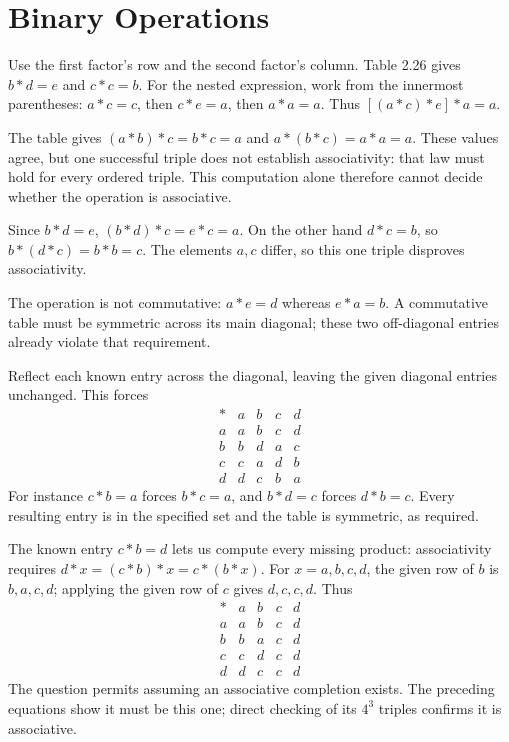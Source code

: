 \section{Binary Operations}


Use the first factor's row and the second factor's column. Table 2.26 gives $b*d=e$ and $c*c=b$. For the nested expression, work from the innermost parentheses: $a*c=c$, then $c*e=a$, then $a*a=a$. Thus $[(a*c)*e]*a=a$.


The table gives $(a*b)*c=b*c=a$ and $a*(b*c)=a*a=a$. These values agree, but one successful triple does not establish associativity: that law must hold for every ordered triple. This computation alone therefore cannot decide whether the operation is associative.


Since $b*d=e$, $(b*d)*c=e*c=a$. On the other hand $d*c=b$, so $b*(d*c)=b*b=c$. The elements $a,c$ differ, so this one triple disproves associativity.


The operation is not commutative: $a*e=d$ whereas $e*a=b$. A commutative table must be symmetric across its main diagonal; these two off-diagonal entries already violate that requirement.


Reflect each known entry across the diagonal, leaving the given diagonal entries unchanged. This forces
\[\begin{array}{c|cccc}*&a&b&c&d\\\hline a&a&b&c&d\\b&b&d&a&c\\c&c&a&d&b\\d&d&c&b&a\end{array}\]
For instance $c*b=a$ forces $b*c=a$, and $b*d=c$ forces $d*b=c$. Every resulting entry is in the specified set and the table is symmetric, as required.


The known entry $c*b=d$ lets us compute every missing product: associativity requires $d*x=(c*b)*x=c*(b*x)$. For $x=a,b,c,d$, the given row of $b$ is $b,a,c,d$; applying the given row of $c$ gives $d,c,c,d$. Thus
\[\begin{array}{c|cccc}*&a&b&c&d\\\hline a&a&b&c&d\\b&b&a&c&d\\c&c&d&c&d\\d&d&c&c&d\end{array}\]
The question permits assuming an associative completion exists. The preceding equations show it must be this one; direct checking of its $4^3$ triples confirms it is associative.

